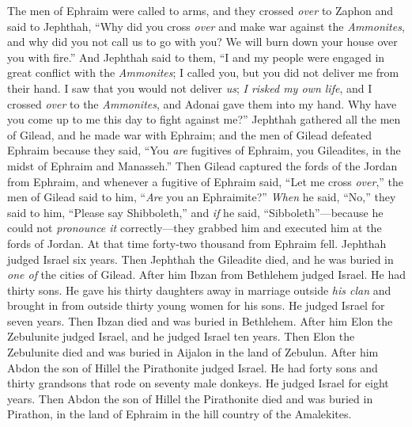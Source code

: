 \begin{biblechapter} %
 The men of Ephraim were called to arms, and they crossed \textit{over} to Zaphon and said to Jephthah, “Why did you cross \textit{over} and make war against the \textit{Ammonites}, and why did you not call us to go with you? We will burn down your house over you with fire.”
\verse And Jephthah said to them, “I and my people were engaged in great conflict with the \textit{Ammonites}; I called you, but you did not deliver me from their hand.
\verse I saw that you would not deliver \textit{us}; \textit{I risked my own life}, and I crossed \textit{over} to the \textit{Ammonites}, and Adonai gave them into my hand. Why have you come up to me this day to fight against me?”
\verse Jephthah gathered all the men of Gilead, and he made war with Ephraim; and the men of Gilead defeated Ephraim because they said, “You \textit{are} fugitives of Ephraim, you Gileadites, in the midst of Ephraim and Manasseh.”
\verse Then Gilead captured the fords of the Jordan from Ephraim, and whenever a fugitive of Ephraim said, “Let me cross \textit{over},” the men of Gilead said to him, “\textit{Are} you an Ephraimite?” \textit{When} he said, “No,”
\verse they said to him, “Please say Shibboleth,” and \textit{if} he said, “Sibboleth”—because he could not \textit{pronounce it} correctly—they grabbed him and executed him at the fords of Jordan. At that time forty-two thousand from Ephraim fell.
\verse Jephthah judged Israel six years. Then Jephthah the Gileadite died, and he was buried in \textit{one of} the cities of Gilead.
 After him Ibzan from Bethlehem judged Israel.
\verse He had thirty sons. He gave his thirty daughters away in marriage outside \textit{his clan} and brought in from outside thirty young women for his sons. He judged Israel for seven years.
\verse Then Ibzan died and was buried in Bethlehem.
\verse After him Elon the Zebulunite judged Israel, and he judged Israel ten years.
\verse Then Elon the Zebulunite died and was buried in Aijalon in the land of Zebulun.
\verse After him Abdon the son of Hillel the Pirathonite judged Israel.
\verse He had forty sons and thirty grandsons that rode on seventy male donkeys. He judged Israel for eight years.
\verse Then Abdon the son of Hillel the Pirathonite died and was buried in Pirathon, in the land of Ephraim in the hill country of the Amalekites.
\end{biblechapter}

